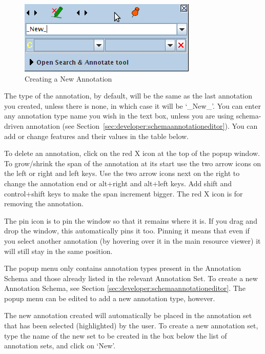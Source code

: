 \begin{figure}[htb]
\begin{center}
\includegraphics[scale=0.5]{new-annotation.png}
\end{center}
\caption{Creating a New Annotation}
\label{fig:new-annotation}
\end{figure}

The type of the annotation, by default, will be the same as the last annotation
you created, unless there is none, in which case it will be `\_New\_'. You can
enter any annotation type name you wish in the text box, unless you are using
schema-driven annotation (see
Section~\ref{sec:developer:schemaannotationeditor}). You can add or change
features and their values in the table below.

To delete an annotation, click on the red X icon at the top of the popup window.
To grow/shrink the span of the annotation at its start use the two arrow icons on
the left or right and left keys. Use the two arrow icons next on the right to
change the annotation end or alt+right and alt+left keys. Add shift and
control+shift keys to make the span increment bigger. The red X icon is for
removing the annotation.

The pin icon is to pin the window so that it remains where it is. If you drag
and drop the window, this automatically pins it too. Pinning it means that even
if you select another annotation (by hovering over it in the main resource
viewer) it will still stay in the same position.

The popup menu only contains annotation types present in the Annotation Schema
and those already listed in the relevant Annotation Set. To create a new
Annotation Schema, see Section \ref{sec:developer:schemaannotationeditor}. The
popup menu can be edited to add a new annotation type, however.

The new annotation created will automatically be placed in the annotation set
that has been selected (highlighted) by the user. To create a new annotation
set, type the name of the new set to be created in the box below the list of
annotation sets, and click on `New'.

